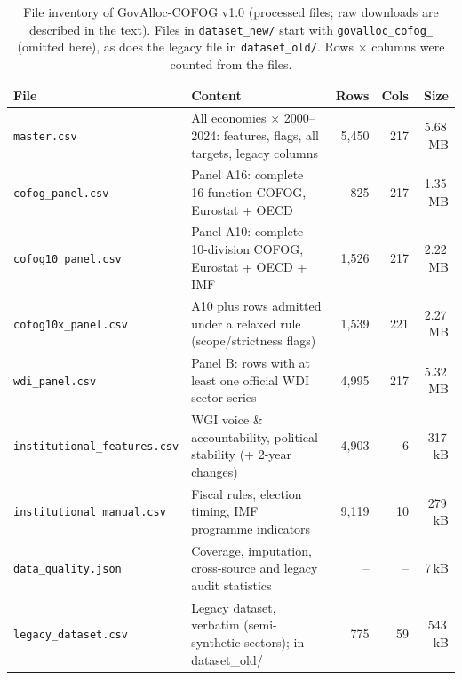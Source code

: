 \begin{table}[t]
\caption{File inventory of GovAlloc-COFOG v1.0 (processed files; raw downloads are described in the text). Files in \texttt{dataset\_new/} start with \texttt{govalloc\_cofog\_} (omitted here), as does the legacy file in \texttt{dataset\_old/}. Rows $\times$ columns were counted from the files.}\label{tab:files}
\centering\footnotesize
\renewcommand{\arraystretch}{1.1}
\begin{tabular}{@{}>{\raggedright\arraybackslash}p{4.4cm}>{\raggedright\arraybackslash}p{4.9cm}rrr@{}}
\toprule
File & Content & Rows & Cols & Size \\
\midrule
\texttt{master.csv} & All economies $\times$ 2000--2024: features, flags, all targets, legacy columns & 5{,}450 & 217 & 5.68\,MB \\
\texttt{cofog\_panel.csv} & Panel A16: complete 16-function COFOG, Eurostat + OECD & 825 & 217 & 1.35\,MB \\
\texttt{cofog10\_panel.csv} & Panel A10: complete 10-division COFOG, Eurostat + OECD + IMF & 1{,}526 & 217 & 2.22\,MB \\
\texttt{cofog10x\_panel.csv} & A10 plus rows admitted under a relaxed rule (scope/strictness flags) & 1{,}539 & 221 & 2.27\,MB \\
\texttt{wdi\_panel.csv} & Panel B: rows with at least one official WDI sector series & 4{,}995 & 217 & 5.32\,MB \\
\texttt{institutional\_features.csv} & WGI voice \& accountability, political stability (+ 2-year changes) & 4{,}903 & 6 & 317\,kB \\
\texttt{institutional\_manual.csv} & Fiscal rules, election timing, IMF programme indicators & 9{,}119 & 10 & 279\,kB \\
\texttt{data\_quality.json} & Coverage, imputation, cross-source and legacy audit statistics & -- & -- & 7\,kB \\
\texttt{legacy\_dataset.csv} & Legacy dataset, verbatim (semi-synthetic sectors); in dataset\_old/ & 775 & 59 & 543\,kB \\
\bottomrule
\end{tabular}
\end{table}
